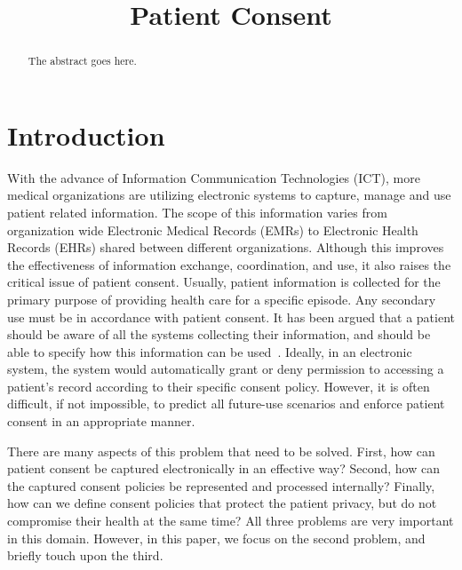\documentclass[conference]{IEEEtran}
\begin{document}
\title{Patient Consent}

\author{
}

\maketitle


\begin{abstract}
The abstract goes here.
\end{abstract}



\section{Introduction}
With the advance of Information Communication Technologies (ICT), more medical organizations are utilizing electronic systems to capture, manage and use patient
related information.  The scope of this information varies from organization wide Electronic Medical Records (EMRs) to Electronic Health Records (EHRs) shared
between different organizations.  Although this improves the effectiveness of information exchange, coordination, and use, it also raises the critical issue of
patient consent. Usually, patient information is collected for the primary purpose of providing health care for a specific episode. Any secondary use must be in
accordance with patient consent.  It has been argued that a patient should be aware of all the systems collecting their information, and should be able to
specify how this information can be used~\cite{kluge2004informed}. Ideally, in an electronic system, the system would automatically grant or deny permission to
accessing a patient's record according to their specific consent policy. However, it is often difficult, if not impossible, to predict all future-use scenarios
and enforce patient consent in an appropriate manner.

There are many aspects of this problem that need to be solved. First, how can patient consent be captured electronically in an effective way? Second, how can
the captured consent policies be represented and processed internally? Finally, how can we define consent policies that protect the patient privacy, but do not
compromise their health at the same time? All three problems are very important in this domain. However, in this paper, we focus on the second problem, and
briefly touch upon the third.
\end{document}
